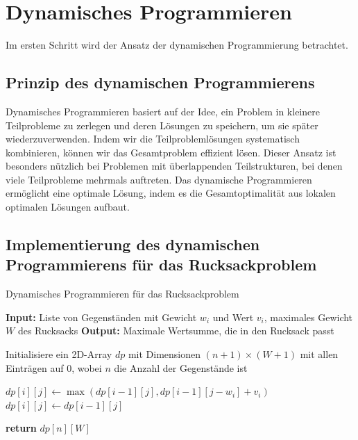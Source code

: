 \documentclass[12pt]{report}
\begin{document}
\newpage
\chapter{Dynamisches Programmieren}
Im ersten Schritt wird der Ansatz der dynamischen Programmierung betrachtet.
\section{Prinzip des dynamischen Programmierens}
Dynamisches Programmieren basiert auf der Idee, ein Problem in kleinere Teilprobleme zu zerlegen und deren Lösungen zu speichern, um sie später wiederzuverwenden. Indem wir die Teilproblemlösungen systematisch kombinieren, können wir das Gesamtproblem effizient lösen. Dieser Ansatz ist besonders nützlich bei Problemen mit überlappenden Teilstrukturen, bei denen viele Teilprobleme mehrmals auftreten. Das dynamische Programmieren ermöglicht eine optimale Lösung, indem es die Gesamtoptimalität aus lokalen optimalen Lösungen aufbaut.\cite{cormen2022introduction}

\section{Implementierung des dynamischen Programmierens für das Rucksackproblem}
\begin{algorithm}
	\caption{Dynamisches Programmieren für das Rucksackproblem}
	\begin{algorithmic}[1]
		\State \textbf{Input:} Liste von Gegenständen mit Gewicht $w_i$ und Wert $v_i$, maximales Gewicht $W$ des Rucksacks
		\State \textbf{Output:} Maximale Wertsumme, die in den Rucksack passt
		
		\State Initialisiere ein 2D-Array $dp$ mit Dimensionen $(n+1) \times (W+1)$ mit allen Einträgen auf $0$, wobei $n$ die Anzahl der Gegenstände ist
		
		\State $dp[i][j] \gets \max(dp[i-1][j], dp[i-1][j-w_i] + v_i)$
		\Else
		\State $dp[i][j] \gets dp[i-1][j]$
		\EndIf
		\EndFor
		\EndFor
		
		\State \textbf{return} $dp[n][W]$
	\end{algorithmic}
\end{algorithm}
\end{document}
